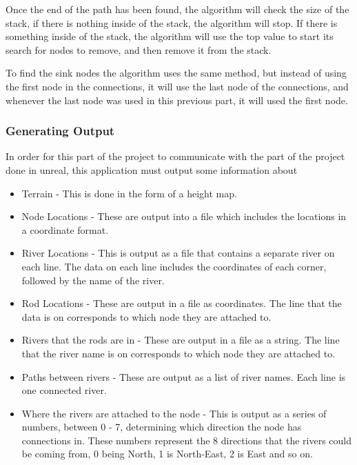 	\newline
	\par
	Once the end of the path has been found, the algorithm will check the size of the stack, if there is nothing inside of the stack, the algorithm will stop. If there is something inside of the stack, the algorithm will use the top value to start its search for nodes to remove, and then remove it from the stack.
	\newline
	\par
	To find the sink nodes the algorithm uses the same method, but instead of using the first node in the connections, it will use the last node of the connections, and whenever the last node was used in this previous part, it will used the first node.
	\newline
	\par
	

\subsubsection{Generating Output}

	In order for this part of the project to communicate with the part of the project done in unreal, this application must output some information about
	\begin{itemize}
		\item Terrain - This is done in the form of a height map.
		\item Node Locations - These are output into a file which includes the locations in a coordinate format.
		\item River Locations - This is output as a file that contains a separate river on each line. The data on each line includes the coordinates of each corner, followed by the name of the river.
		\item Rod Locations - These are output in a file as coordinates. The line that the data is on corresponds to which node they are attached to.
		\item Rivers that the rods are in - These are output in a file as a string. The line that the river name is on corresponds to which node they are attached to.
		\item Paths between rivers - These are output as a list of river names. Each line is one connected river.
		\item Where the rivers are attached to the node - This is output as a series of numbers, between 0 - 7, determining which direction the node has connections in. These numbers represent the 8 directions that the rivers could be coming from, 0 being North, 1 is North-East, 2 is East and so on.
	\end{itemize}

